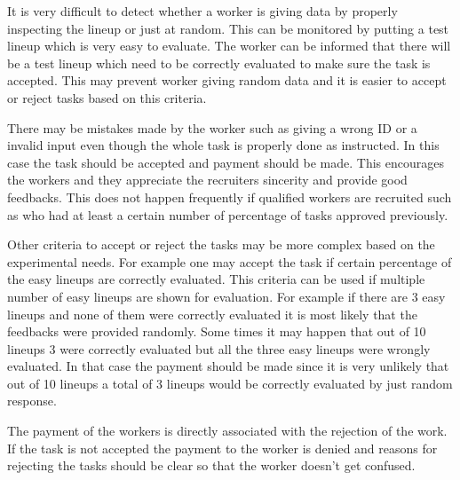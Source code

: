 \documentclass[11pt]{article}
\begin{document}
It is very difficult to detect whether a worker is giving data by properly inspecting the lineup or just at random. This can be monitored by putting a test lineup which is very easy to evaluate. The worker can be informed that there will be a test lineup which need to be correctly evaluated to make sure the task is accepted. This may prevent worker giving random data and it is easier to accept or reject tasks based on this criteria.  

There may be mistakes made by the worker such as giving a wrong ID or a invalid input even though the whole task is properly done as instructed. In this case the task should be accepted and payment should be made. This encourages the workers and they appreciate the recruiters sincerity and provide good feedbacks. This does not happen frequently if qualified workers are recruited such as who had at least a certain number of percentage of tasks approved previously. 

Other criteria to accept or reject the tasks may be more complex based on the experimental needs. For example one may accept the task if certain percentage of the easy lineups are correctly evaluated. This criteria can be used if multiple number of easy lineups are shown for evaluation. For example if there are 3 easy lineups and none of them were correctly evaluated it is most likely that the feedbacks were provided randomly. Some times it may happen that out of 10 lineups 3 were correctly evaluated but all the three easy lineups were wrongly evaluated. In that case the payment should be made since it is very unlikely that out of 10 lineups a total of 3 lineups would be correctly evaluated by just random response.

The payment of the workers is directly associated with the rejection of the work. If the task is not accepted the payment to the worker is denied and reasons for rejecting the tasks should be clear so that the worker doesn't get confused.

\end{document}
